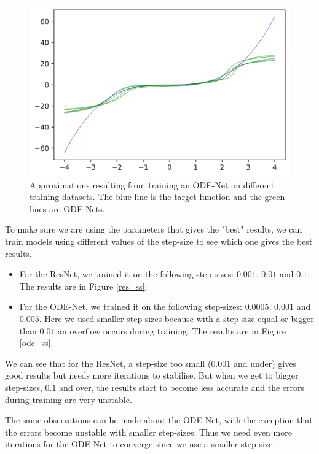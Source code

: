 \documentclass[10pt,a4paper]{article}
\theoremstyle{definition}
\theoremstyle{plain}
\begin{document}
\begin{figure}[!h]
\center
\includegraphics[scale=0.6]{odenet_random.png}
\caption{Approximations resulting from training an ODE-Net on different training datasets. The blue line is the target function and the green lines are ODE-Nets.}
\label{ode_r}
\end{figure}

To make sure we are using the parameters that gives the "best" results, we can train models using different values of the step-size to see which one gives the best results. 
\begin{itemize}
\item For the ResNet, we trained it on the following step-sizes: $0.001$, $0.01$ and $0.1$. The results are in Figure \ref{res_ss};
\item For the ODE-Net, we trained it on the following step-sizes: $0.0005$, $0.001$ and $0.005$. Here we used smaller step-sizes because with a step-size equal or bigger than $0.01$ an overflow occurs during training. The results are in Figure \ref{ode_ss}.
\end{itemize}

We can see that for the ResNet, a step-size too small ($0.001$ and under) gives good results but needs more iterations to stabilise. But when we get to bigger step-sizes, $0.1$ and over, the results start to become less accurate and the errors during training are very unstable.

The same observations can be made about the ODE-Net, with the exception that the errors become unstable with smaller step-sizes. Thus we need even more iterations for the ODE-Net to converge since we use a smaller step-size.
\end{document}
